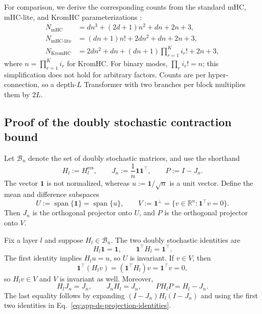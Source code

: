 \documentclass{article}
\newcommand{\Hres}{H^{\mathrm{res}}}
\begin{document}
For comparison, we derive the corresponding counts from the standard mHC, mHC-lite, and KromHC parameterizations \citep{xie2026mhc,yang2026mhclite,zhou2026kromhc}:
\begin{align}
 N_{\mathrm{mHC}} &= dn^3+(2d+1)n^2+dn+2n+3,\\
 N_{\mathrm{mHC\text{-}lite}} &= (dn+1)n!+2dn^2+dn+2n+3,\\
 N_{\mathrm{KromHC}} &= 2dn^2+dn+(dn+1)\prod_{r=1}^{K}i_r!+2n+3,
 \label{eq:prior-counts}
\end{align}
where $n=\prod_{r=1}^{K}i_r$ for KromHC. For binary modes, $\prod_r i_r!=n$; this simplification does not hold for arbitrary factors. Counts are per hyper-connection, so a depth-$L$ Transformer with two branches per block multiplies them by $2L$.

\subsection{Proof of the doubly stochastic contraction bound}
\label{app:ds-proof}
Let $\mathcal B_n$ denote the set of doubly stochastic matrices, and use the shorthand
\begin{equation}
 H_l:=\Hres_l,\mspace{36mu}
 J_n:=\frac{1}{n}\mathbf 1\mathbf 1^\top,
 \mspace{36mu}
 P:=I-J_n.
 \label{eq:app-ds-projectors}
\end{equation}
The vector $\mathbf 1$ is not normalized, whereas
$u:=\mathbf 1/\sqrt n$ is a unit vector. Define the mean and difference
subspaces
\begin{equation}
 U:=\operatorname{span}\{\mathbf 1\}=\operatorname{span}\{u\},
 \mspace{36mu}
 V:=\mathbf 1^\perp
 =\{v\in\mathbb R^n:\mathbf 1^\top v=0\}.
 \label{eq:app-ds-subspaces}
\end{equation}
Then $J_n$ is the orthogonal projector onto $U$, and $P$ is the
orthogonal projector onto $V$.

Fix a layer $l$ and suppose $H_l\in\mathcal B_n$. The two doubly stochastic
identities are
\begin{equation}
 H_l\mathbf 1=\mathbf 1,
 \mspace{36mu}
 \mathbf 1^\top H_l=\mathbf 1^\top.
 \label{eq:app-ds-identities}
\end{equation}
The first identity implies $H_l u=u$, so $U$ is invariant. If $v\in V$,
then
\[
 \mathbf 1^\top(H_lv)=(\mathbf 1^\top H_l)v=\mathbf 1^\top v=0,
\]
so $H_lv\in V$ and $V$ is invariant as well. Moreover,
\begin{equation}
 H_lJ_n=J_n,
 \mspace{36mu}
 J_nH_l=J_n,
 \mspace{36mu}
 PH_lP=H_l-J_n.
 \label{eq:app-ds-projection-identities}
\end{equation}
The last equality follows by expanding $(I-J_n)H_l(I-J_n)$ and using the
first two identities in Eq.~\ref{eq:app-ds-projection-identities}.
\end{document}
